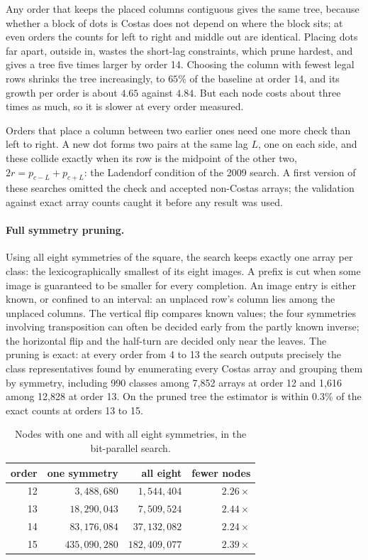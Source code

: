 \noindent Any order that keeps the placed columns contiguous gives the same tree, because whether a block
of dots is Costas does not depend on where the block sits; at even orders the counts for left to right and
middle out are identical. Placing dots far apart, outside in, wastes the short-lag constraints, which prune
hardest, and gives a tree five times larger by order 14. Choosing the column with fewest legal rows shrinks
the tree increasingly, to $65\%$ of the baseline at order 14, and its growth per order is about $4.65$
against $4.84$. But each node costs about three times as much, so it is slower at every order measured.

Orders that place a column between two earlier ones need one more check than left to right. A new dot
forms two pairs at the same lag $L$, one on each side, and these collide exactly when its row is the
midpoint of the other two, $2r=p_{c-L}+p_{c+L}$: the Ladendorf condition of the 2009 search. A first
version of these searches omitted the check and accepted non-Costas arrays; the validation against exact
array counts caught it before any result was used.

\paragraph{Full symmetry pruning.} Using all eight symmetries of the square, the search keeps exactly one
array per class: the lexicographically smallest of its eight images. A prefix is cut when some image is
guaranteed to be smaller for every completion. An image entry is either known, or confined to an interval:
an unplaced row's column lies among the unplaced columns. The vertical flip compares known values; the four
symmetries involving transposition can often be decided early from the partly known inverse; the horizontal
flip and the half-turn are decided only near the leaves. The pruning is exact: at every order from 4 to
13 the search outputs precisely the class representatives found by enumerating every Costas array and
grouping them by symmetry, including 990 classes among 7{,}852 arrays at order 12 and 1{,}616 among 12{,}828
at order 13. On the pruned tree the estimator is within $0.3\%$ of the exact counts at orders 13 to 15.

\begin{table}[H]
\centering
\small
\begin{tabular}{@{}rrrr@{}}
\toprule
order & one symmetry & all eight & fewer nodes \\
\midrule
12 & $3{,}488{,}680$ & $1{,}544{,}404$ & $2.26\times$ \\
13 & $18{,}290{,}043$ & $7{,}509{,}524$ & $2.44\times$ \\
14 & $83{,}176{,}084$ & $37{,}132{,}082$ & $2.24\times$ \\
15 & $435{,}090{,}280$ & $182{,}409{,}077$ & $2.39\times$ \\
\bottomrule
\end{tabular}
\caption{Nodes with one and with all eight symmetries, in the bit-parallel search.}
\label{tab:symmetry}
\end{table}


